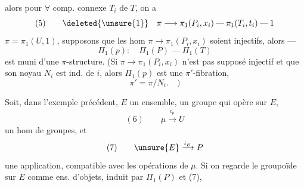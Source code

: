 alors pour $\forall$ comp. connexe $T_i$ de $T$,
on a 
\[
(5)\qquad \deleted{\unsure{1}}\quad
\pi\longrightarrow\pi_1(P_i,x_i)\mathbin{\text{---}}\pi_1(T_i,t_i)\mathbin{\text{---}}1
\]
$\pi=\pi_1(U,1)$, supposons que les
hom $\pi\longrightarrow\pi_1(P_i,x_i)$ soient injectifs, alors ---
\[
\Pi_1(p):\quad \Pi_1(P)\mathbin{\text{---}}\Pi_1(T)
\]
est muni d'une $\pi$-structure. (Si
$\pi\longrightarrow\pi_1(P_i,x_i)$  n'est pas supposé injectif
et que son noyau $N_i$ est ind. de $i$,
alors $\Pi_1(p)$ est  une $\pi'$-fibration,
\[
\pi'=\pi/N_i.\quad)
\]

Soit, dans l'exemple précédent, $E$ un ensemble,
\inserted{$\mu$} un groupe  qui opère sur
$E$,
\[
(6)\qquad \mu\xrightarrow{i_\mu}U
\]
un hom de groupes, et
\[
(7)\qquad \unsure{E}\xrightarrow{i_E}P
\]
une  application, compatible avec les
opérations de $\mu$. Si on regarde le  groupoïde
 sur $E$ comme ens. d'objets, induit par
$\Pi_1(P)$ et (7),
